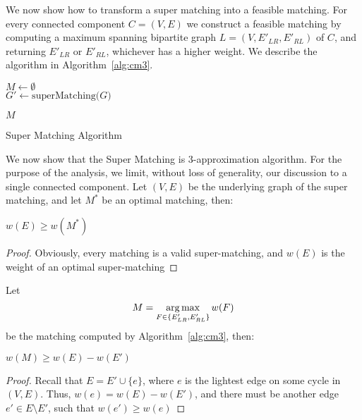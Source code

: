 We now show how to transform a super matching into a feasible matching.
For every connected component $C = (V, E)$ we construct a feasible matching by
computing a maximum spanning bipartite graph $L = (V, E'_{LR}, E'_{RL})$ of $C$,
and returning $E'_{LR}$ or $E'_{RL}$,
whichever has a higher weight. 
We describe the algorithm in Algorithm~\ref{alg:cm3}.

\begin{algorithm}
\label{alg:cm3}

$M \leftarrow \emptyset$								\\
$G' \leftarrow \text{superMatching($G$)}$				\\


\Return $M$
\caption{Super Matching Algorithm}
\end{algorithm}

We now show that the Super Matching is 3-approximation algorithm.
For the purpose of the analysis, we limit, without loss of generality, 
our discussion to a single connected component.
Let $(V, E)$ be the underlying graph of the super matching, 
and let $M^*$ be an optimal matching, then:
\begin{lemma}
\label{lm:super-geq-m^*}
$w(E) \geq w(M^*)$
\end{lemma}

\begin{proof}
Obviously, every matching is a valid super-matching, 
and $w(E)$ is the weight of an optimal super-matching 
\end{proof}

Let
$$ M = \operatorname*{arg\,max}_{F \in \{ E'_{LR}, E'_{RL} \}}{w(F)} $$
be the matching computed by Algorithm~\ref{alg:cm3}, then:

\begin{lemma}
\label{lm:more_than_e}
$w(M) \geq w(E) - w(E')$
\end{lemma}

\begin{proof}
Recall that $E = E' \cup \{e\}$, 
where $e$ is the lightest edge on some cycle in $(V, E)$. 
Thus, $w(e) = w(E) - w(E')$, 
and there must be another edge $e' \in E \setminus E'$, 
such that $w(e') \geq w(e)$
\end{proof}

